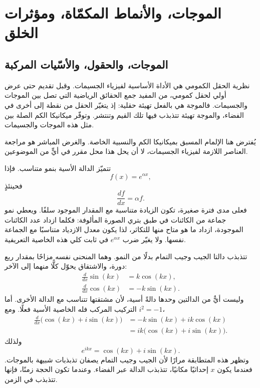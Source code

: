 \chapter{الموجات، والأنماط المكمّاة، ومؤثرات الخلق}

\section{الموجات، والحقول، والأسّيات المركبة}

نظرية الحقل الكمومي هي الأداة الأساسية لفيزياء الجسيمات. وقبل تقديم حتى عرض أولي لحقل كمومي، من المفيد جمع الحقائق الرياضية التي تصل بين الموجات والجسيمات. فالموجة هي بالفعل تهيئة حقلية: إذ يتغيّر الحقل من نقطة إلى أخرى في الفضاء، والموجة تهيئة تتذبذب فيها تلك القيم وتنتشر. وتوفّر ميكانيكا الكم الصلة بين مثل هذه الموجات والجسيمات.

يُفترض هنا الإلمام المسبق بميكانيكا الكم والنسبية الخاصة. والغرض المباشر هو مراجعة العناصر اللازمة لفيزياء الجسيمات، لا أن يحل هذا محل مقرر في أيٍّ من الموضوعين.

تتميّز الدالة الأسية بنمو متناسب. فإذا
\begin{equation}
f(x)=e^{\alpha x},
\end{equation}
فحينئذٍ
\begin{equation}
\frac{df}{dx}=\alpha f.
\end{equation}
فعلى مدى فترة صغيرة، تكون الزيادة متناسبة مع المقدار الموجود سلفًا. ويعطي نمو جماعة من الكائنات في طبق بتري الصورة المألوفة: فكلما ازداد عدد الكائنات الموجودة، ازداد ما هو متاح منها للتكاثر، لذا يكون معدل الازدياد متناسبًا مع الجماعة نفسها. ولا يغيّر ضرب \(e^{\alpha x}\) في ثابت كلي هذه الخاصية التعريفية.

تتذبذب دالتا الجيب وجيب التمام بدلًا من النمو. وهما المنحنى نفسه مزاحًا بمقدار ربع دورة، والاشتقاق يحوّل كلًّا منهما إلى الآخر:
\begin{align}
\frac{d}{dx}\sin(kx)&=k\cos(kx),\\
\frac{d}{dx}\cos(kx)&=-k\sin(kx).
\end{align}
وليست أيٌّ من الدالتين وحدها دالةً أسية، لأن مشتقتها تتناسب مع الدالة الأخرى. أما التركيب المركب فله الخاصية الأسية فعلًا. ومع \(i^2=-1\)،
\begin{align}
\frac{d}{dx}\bigl(\cos(kx)+i\sin(kx)\bigr)
&=-k\sin(kx)+ik\cos(kx)\\
&=ik\bigl(\cos(kx)+i\sin(kx)\bigr).
\end{align}
ولذلك
\begin{equation}
e^{ikx}=\cos(kx)+i\sin(kx).
\end{equation}
وتظهر هذه المتطابقة مرارًا لأن الجيب وجيب التمام يصفان تذبذبات شبيهة بالموجات. فعندما يكون \(x\) إحداثيًا مكانيًا، تتذبذب الدالة عبر الفضاء. وعندما تكون الحجة زمنًا، فإنها تتذبذب في الزمن.

